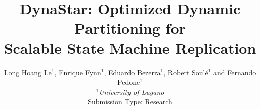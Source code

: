 \documentclass[10pt,twocolumn]{article}
\newcommand{\dynastar}{\mbox{DynaStar}\xspace}
\begin{document}
\title{\dynastar: Optimized Dynamic Partitioning for\\ Scalable State Machine Replication}
\author{Long Hoang Le$^1$, Enrique Fynn$^1$, Eduardo Bezerra$^1$, Robert Soul\'{e}$^1$ and Fernando Pedone$^1$ \\
\small {\em  $^1$University of Lugano} \\ [2mm]
\small Submission Type: Research
}
\date{}
\maketitle

\begin{abstract}
  
\end{abstract}










%



%




\end{document}
